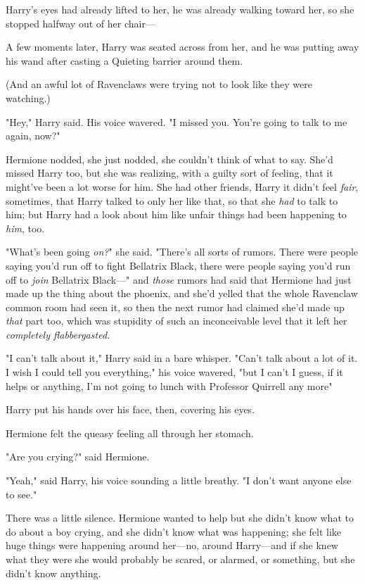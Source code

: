 Harry's eyes had already lifted to her, he was already walking toward her, so
she stopped halfway out of her chair—

A few moments later, Harry was seated across from her, and he was putting away
his wand after casting a Quieting barrier around them.

(And an awful lot of Ravenclaws were trying not to look like they were
watching.)

"Hey," Harry said. His voice wavered. "I missed you. You're{\el} going to
talk to me again, now?"

Hermione nodded, she just nodded, she couldn't think of what to say. She'd
missed Harry too, but she was realizing, with a guilty sort of feeling, that it
might've been a lot worse for him. She had other friends, Harry{\el} it
didn't feel \emph{fair}, sometimes, that Harry talked to only her like that, so
that she \emph{had} to talk to him; but Harry had a look about him like unfair
things had been happening to \emph{him}, too.

"What's been going \emph{on?}" she said. "There's all sorts of rumors. There
were people saying you'd run off to fight Bellatrix Black, there were people
saying you'd run off to \emph{join} Bellatrix Black—" and \emph{those} rumors
had said that Hermione had just made up the thing about the phoenix, and she'd
yelled that the whole Ravenclaw common room had seen it, so then the next rumor
had claimed she'd made up \emph{that} part too, which was stupidity of such an
inconceivable level that it left her \emph{completely flabbergasted.}

"I can't talk about it," Harry said in a bare whisper. "Can't talk about a lot
of it. I wish I could tell you everything," his voice wavered, "but I
can't{\el} I guess, if it helps or anything, I'm not going to lunch with
Professor Quirrell any more{\el}"

Harry put his hands over his face, then, covering his eyes.

Hermione felt the queasy feeling all through her stomach.

"Are you crying?" said Hermione.

"Yeah," said Harry, his voice sounding a little breathy. "I don't want anyone
else to see."

There was a little silence. Hermione wanted to help but she didn't know what to
do about a boy crying, and she didn't know what was happening; she felt like
huge things were happening around her—no, around Harry—and if she knew what
they were she would probably be scared, or alarmed, or something, but she
didn't know anything.

